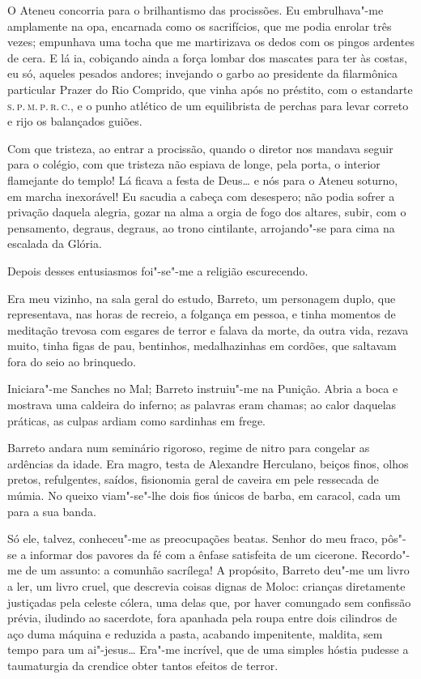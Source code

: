O Ateneu concorria para o
brilhantismo das procissões. Eu embrulhava"-me amplamente na opa,
encarnada como os sacrifícios, que me podia enrolar três vezes;
empunhava uma tocha que me martirizava os dedos com os pingos ardentes
de cera. E lá ia, cobiçando ainda a força lombar dos mascates para ter
às costas, eu só, aqueles pesados andores; invejando o garbo ao
presidente da filarmônica particular Prazer do Rio Comprido, que vinha
após no préstito, com o estandarte \textsc{s.\,p.\,m.\,p.\,r.\,c.}, e o punho atlético de
um equilibrista de perchas para levar correto e rijo os balançados
guiões. 

Com que tristeza, ao entrar a procissão, quando o diretor nos
mandava seguir para o colégio, com que tristeza não espiava de longe,
pela porta, o interior flamejante do templo! Lá ficava a festa de
Deus\ldots{} e nós para o Ateneu soturno, em marcha inexorável! Eu sacudia a
cabeça com desespero; não podia sofrer a privação daquela alegria,
gozar na alma a orgia de fogo dos altares, subir, com o pensamento,
degraus, degraus, ao trono cintilante, arrojando"-se para cima na
escalada da Glória. 

Depois desses entusiasmos foi"-se"-me a religião escurecendo.

Era meu vizinho, na sala geral do estudo, Barreto, um personagem duplo,
que representava, nas horas de recreio, a folgança em pessoa, e tinha
momentos de meditação trevosa com esgares de terror e falava da morte,
da outra vida, rezava muito, tinha figas de pau, bentinhos,
medalhazinhas em cordões, que saltavam fora do seio ao brinquedo.

Iniciara"-me Sanches no Mal; Barreto instruiu"-me na Punição. Abria a
boca e mostrava uma caldeira do inferno; as palavras eram chamas; ao
calor daquelas práticas, as culpas ardiam como sardinhas em frege.

Barreto andara num seminário rigoroso, regime de nitro para congelar as
ardências da idade. Era magro, testa de Alexandre Herculano, beiços
finos, olhos pretos, refulgentes, saídos, fisionomia geral de caveira
em pele ressecada de múmia. No queixo viam"-se"-lhe dois fios únicos
de barba, em caracol, cada um para a sua banda. 

Só ele, talvez,
conheceu"-me as preocupações beatas. Senhor do meu fraco, pôs"-se a
informar dos pavores da fé com a ênfase satisfeita de um cicerone.
Recordo"-me de um assunto: a comunhão sacrílega! A propósito, Barreto
deu"-me um livro a ler, um livro cruel, que descrevia coisas dignas de
Moloc: crianças diretamente justiçadas pela celeste cólera, uma delas
que, por haver comungado sem confissão prévia, iludindo ao sacerdote,
fora apanhada pela roupa entre dois cilindros de aço duma máquina e
reduzida a pasta, acabando impenitente, maldita, sem tempo para um
ai"-jesus\ldots{} Era"-me incrível, que de uma simples hóstia pudesse a
taumaturgia da crendice obter tantos efeitos de terror. 

